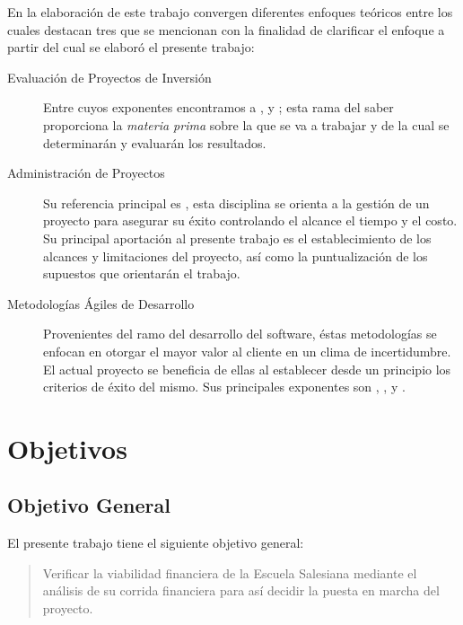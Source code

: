 En la elaboración de este trabajo convergen diferentes enfoques teóricos entre los cuales destacan tres que se mencionan con la finalidad de clarificar el enfoque a partir del cual se elaboró el presente trabajo:

\begin{description}
    \item[Evaluación de Proyectos de Inversión] Entre cuyos exponentes encontramos a \citep{SAPAG2007}, \citep{COSS2000} y \citep{Leland2006}; esta rama del saber proporciona la \emph{materia prima} sobre la que se va a trabajar y de la cual se determinarán y evaluarán los resultados.
    \item[Administración de Proyectos] Su referencia principal es \citep{PMBOK2008}, esta disciplina se orienta a la gestión de un proyecto para asegurar su éxito controlando el alcance el tiempo y el costo. Su principal aportación al presente trabajo es el establecimiento de los alcances y limitaciones del proyecto, así como la puntualización de los supuestos que orientarán el trabajo.
    \item[Metodologías Ágiles de Desarrollo] Provenientes del ramo del desarrollo del software, éstas metodologías se enfocan en otorgar el mayor valor al cliente en un clima de incertidumbre. El actual proyecto se beneficia de ellas al establecer desde un principio los criterios de éxito del mismo. Sus principales exponentes son \citep{AgileManifesto2001}, \citep{Wells2009}, \citep{Scrum2010} y \citep{Poppendieck2001}.
\end{description}

\section{Objetivos}

\subsection{Objetivo General}
\label{sub:ObjetivoGeneral}

El presente trabajo tiene el siguiente objetivo general:

\begin{quotation}
	Verificar la viabilidad financiera de la Escuela Salesiana mediante el análisis de su corrida financiera para así decidir la puesta en marcha del proyecto.
\end{quotation}

